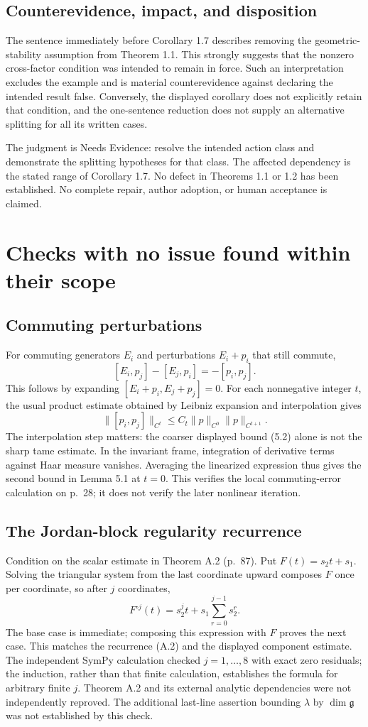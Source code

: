 \documentclass[10pt]{article}
\begin{document}
\subsection*{Counterevidence, impact, and disposition}
The sentence immediately before Corollary 1.7 describes removing the geometric-stability assumption from Theorem 1.1. This strongly suggests that the nonzero cross-factor condition was intended to remain in force. Such an interpretation excludes the example and is material counterevidence against declaring the intended result false. Conversely, the displayed corollary does not explicitly retain that condition, and the one-sentence reduction does not supply an alternative splitting for all its written cases.\par
The judgment is Needs Evidence: resolve the intended action class and demonstrate the splitting hypotheses for that class. The affected dependency is the stated range of Corollary 1.7. No defect in Theorems 1.1 or 1.2 has been established. No complete repair, author adoption, or human acceptance is claimed.\par
\section*{Checks with no issue found within their scope}
\subsection*{Commuting perturbations}
For commuting generators \(E_i\) and perturbations \(E_i+p_i\) that still commute, \[[E_i,p_j]-[E_j,p_i]=-[p_i,p_j].\] This follows by expanding \([E_i+p_i,E_j+p_j]=0\). For each nonnegative integer \(t\), the usual product estimate obtained by Leibniz expansion and interpolation gives \[\|[p_i,p_j]\|_{C^t}\leq C_t\|p\|_{C^0}\|p\|_{C^{t+1}}.\] The interpolation step matters: the coarser displayed bound (5.2) alone is not the sharp tame estimate. In the invariant frame, integration of derivative terms against Haar measure vanishes. Averaging the linearized expression thus gives the second bound in Lemma 5.1 at \(t=0\). This verifies the local commuting-error calculation on p. 28; it does not verify the later nonlinear iteration.\par
\subsection*{The Jordan-block regularity recurrence}
Condition on the scalar estimate in Theorem A.2 (p. 87). Put \(F(t)=s_2t+s_1\). Solving the triangular system from the last coordinate upward composes \(F\) once per coordinate, so after \(j\) coordinates, \[F^{\circ j}(t)=s_2^jt+s_1\sum_{r=0}^{j-1}s_2^r .\] The base case is immediate; composing this expression with \(F\) proves the next case. This matches the recurrence (A.2) and the displayed component estimate. The independent SymPy calculation checked \(j=1,\ldots,8\) with exact zero residuals; the induction, rather than that finite calculation, establishes the formula for arbitrary finite \(j\). Theorem A.2 and its external analytic dependencies were not independently reproved. The additional last-line assertion bounding \(\lambda\) by \(\dim\mathfrak g\) was not established by this check.\par
\end{document}
